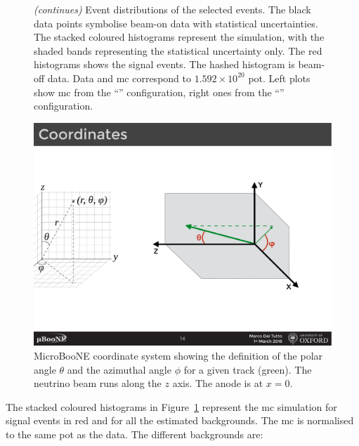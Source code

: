 \begin{figure}[]
{   \label{fig:vtxz_tune1}} \quad
{} \quad
\caption[Distribution of Selected Events (Vertex $x$, $y$ and $z$)]{\emph{(continues)} Event distributions of the selected events. The black data points symbolise beam-on data with statistical uncertainties. The stacked coloured histograms represent the simulation, with the shaded bands representing the statistical uncertainty only. The red histograms shows the signal events. The hashed histogram is beam-off data. Data and \acrshort{mc} correspond to $1.592 \times 10^{20}$ \acrshort{pot}. Left plots show \acrshort{mc} from the ``\tuneone'' configuration, right ones from the ``\tunethree'' configuration.}
\label{fig:final_dist}
\end{figure}
%
\begin{figure}[]
\centering
\includegraphics[width=.45\textwidth]{images/coord_system}
\caption[MicroBooNE Coordinate System]{MicroBooNE coordinate system showing the definition of the polar angle $\theta$ and the azimuthal angle $\phi$ for a given track (green). The neutrino beam runs along the $z$ axis. The anode is at $x = 0$.}
\label{fig:coord_system}
\end{figure}
%
The stacked coloured histograms in Figure~\ref{fig:final_dist} represent the \acrshort{mc} simulation for signal events in red and for all the estimated backgrounds. The \acrshort{mc} is normalised to the same \acrshort{pot} as the data. The different backgrounds are:
